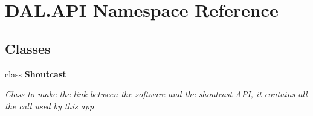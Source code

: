 \hypertarget{namespace_d_a_l_1_1_a_p_i}{}\section{D\+A\+L.\+A\+PI Namespace Reference}
\label{namespace_d_a_l_1_1_a_p_i}
\subsection*{Classes}
\begin{DoxyCompactItemize}
\item 
class {\bfseries Shoutcast}
\begin{DoxyCompactList}\small\item\em Class to make the link between the software and the shoutcast \hyperlink{namespace_d_a_l_1_1_a_p_i}{A\+PI}, it contains all the call used by this app \end{DoxyCompactList}\end{DoxyCompactItemize}
